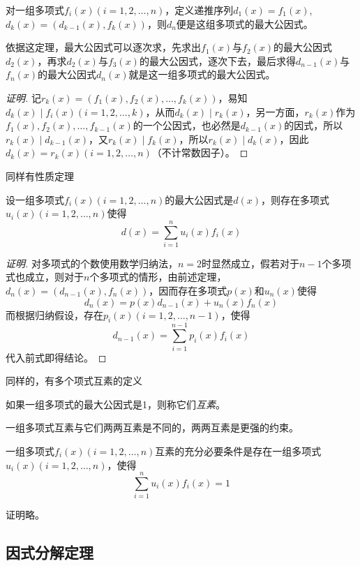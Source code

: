 \begin{theorem}
  对一组多项式$f_i(x)(i=1,2,\ldots,n)$，定义递推序列$d_1(x)=f_1(x)$,$d_k(x)=(d_{k-1}(x), f_k(x))$，则$d_n$便是这组多项式的最大公因式。
\end{theorem}

依据这定理，最大公因式可以逐次求，先求出$f_1(x)$与$f_2(x)$的最大公因式$d_2(x)$，再求$d_2(x)$与$f_3(x)$的最大公因式，逐次下去，最后求得$d_{n-1}(x)$与$f_n(x)$的最大公因式$d_n(x)$就是这一组多项式的最大公因式。

\begin{proof}[证明]
  记$r_k(x)=(f_1(x),f_2(x),\ldots,f_k(x))$，易知$d_k(x) \mid f_i(x)(i=1,2,\ldots,k)$，从而$d_k(x) \mid r_k(x)$，另一方面，$r_k(x)$作为$f_1(x),f_2(x),\ldots,f_{k-1}(x)$的一个公因式，也必然是$d_{k-1}(x)$的因式，所以$r_k(x) \mid d_{k-1}(x)$，又$r_k(x) \mid f_k(x)$，所以$r_k(x) \mid d_k(x)$，因此$d_k(x)=r_k(x)(i=1,2,\ldots,n)$（不计常数因子）。
\end{proof}

同样有性质定理
\begin{theorem}
  设一组多项式$f_i(x)(i=1,2,\ldots,n)$的最大公因式是$d(x)$，则存在多项式$u_i(x)(i=1,2,\ldots,n)$使得
  \[ d(x) = \sum_{i=1}^n u_i(x)f_i(x) \]
\end{theorem}

\begin{proof}[证明]
  对多项式的个数使用数学归纳法，$n=2$时显然成立，假若对于$n-1$个多项式也成立，则对于$n$个多项式的情形，由前述定理，$d_n(x)=(d_{n-1}(x), f_n(x))$，因而存在多项式$p(x)$和$u_n(x)$使得
  \[ d_n(x) = p(x)d_{n-1}(x) + u_n(x)f_n(x) \]
  而根据归纳假设，存在$p_i(x)(i=1,2,\ldots,n-1)$，使得
  \[ d_{n-1}(x) = \sum_{i=1}^{n-1}p_i(x)f_i(x) \]
  代入前式即得结论。
\end{proof}

同样的，有多个项式互素的定义
\begin{definition}
  如果一组多项式的最大公因式是1，则称它们\emph{互素}。
\end{definition}

一组多项式互素与它们两两互素是不同的，两两互素是更强的约束。

\begin{theorem}
  一组多项式$f_i(x)(i=1,2,\ldots,n)$互素的充分必要条件是存在一组多项式$u_i(x)(i=1,2,\ldots,n)$，使得
  \[ \sum_{i=1}^n u_i(x)f_i(x) = 1 \]
\end{theorem}
证明略。

\subsection{因式分解定理}
\label{sec:factoring-theorem}

